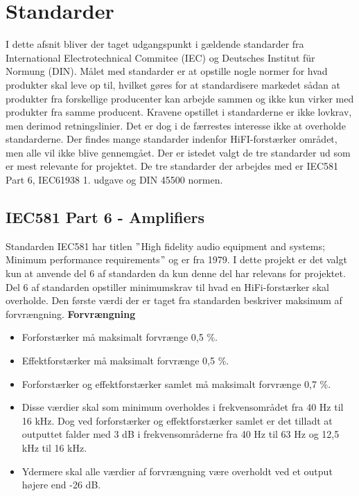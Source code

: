\section{Standarder}
I dette afsnit bliver der taget udgangspunkt i gældende standarder fra International Electrotechnical Commitee (IEC) og Deutsches Institut f\"{u}r Normung (DIN). Målet med standarder er at opstille nogle normer for hvad produkter skal leve op til, hvilket gøres for at standardisere markedet sådan at produkter fra forskellige producenter kan arbejde sammen og ikke kun virker med produkter fra samme producent. Kravene opstillet i standarderne er ikke lovkrav, men derimod retningslinier. Det er dog i de færrestes interesse ikke at overholde standarderne.
\newline
\newline
Der findes mange standarder indenfor HiFI-forstærker området, men alle vil ikke blive gennemgået. Der er istedet valgt de tre standarder ud som er mest relevante for projektet. De tre standarder der arbejdes med er IEC581 Part 6, IEC61938 1. udgave og DIN 45500 normen. 

\subsection*{IEC581 Part 6 - Amplifiers}
\label{IEC581}
Standarden IEC581 har titlen $"$High fidelity audio equipment and systems; Minimum performance requirements$"$ og er fra 1979. I dette projekt er det valgt kun at anvende del 6 af standarden da kun denne del har relevans for projektet. Del 6 af standarden opstiller minimumskrav til hvad en HiFi-forstærker skal overholde. \cite{IEC581-6}%
\newline
\newline
Den første værdi der er taget fra standarden beskriver maksimum af forvrængning.
\newline 
\newline
\textbf{Forvrængning}
\begin{itemize}
\item Forforstærker må maksimalt forvrænge 0,5 \%.
\item Effektforstærker må maksimalt forvrænge 0,5 \%.
\item Forforstærker og effektforstærker samlet må maksimalt forvrænge 0,7 \%.
\item Disse værdier skal som minimum overholdes i frekvensområdet fra 40 Hz til 16 kHz. Dog ved forforstærker og effektforstærker samlet er det tilladt at outputtet falder med 3 dB i frekvensområderne fra 40 Hz til 63 Hz og 12,5 kHz til 16 kHz. 
\item Ydermere skal alle værdier af forvrængning være overholdt ved et output højere end -26 dB.
\end{itemize}

